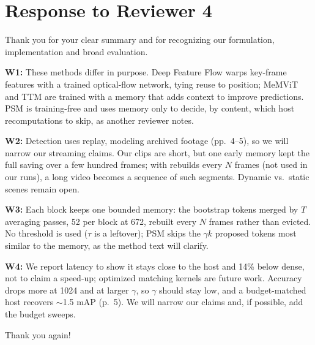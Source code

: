 \section*{Response to Reviewer 4}

Thank you for your clear summary and for recognizing our formulation, implementation and broad evaluation.

\textbf{W1:} These methods differ in purpose. Deep Feature Flow warps key-frame features with a trained optical-flow network, tying reuse to position; MeMViT and TTM are trained with a memory that adds context to improve predictions. PSM is training-free and uses memory only to decide, by content, which host recomputations to skip, as another reviewer notes.

\textbf{W2:} Detection uses replay, modeling archived footage (pp.~4--5), so we will narrow our streaming claims. Our clips are short, but one early memory kept the full saving over a few hundred frames; with rebuilds every $N$ frames (not used in our runs), a long video becomes a sequence of such segments. Dynamic vs.\ static scenes remain open.

\textbf{W3:} Each block keeps one bounded memory: the bootstrap tokens merged by $T$ averaging passes, 52 per block at 672, rebuilt every $N$ frames rather than evicted. No threshold is used ($\tau$ is a leftover); PSM skips the $\gamma k$ proposed tokens most similar to the memory, as the method text will clarify.

\textbf{W4:} We report latency to show it stays close to the host and 14\% below dense, not to claim a speed-up; optimized matching kernels are future work. Accuracy drops more at 1024 and at larger $\gamma$, so $\gamma$ should stay low, and a budget-matched host recovers $\sim$1.5 mAP (p.~5). We will narrow our claims and, if possible, add the budget sweeps.

Thank you again!
